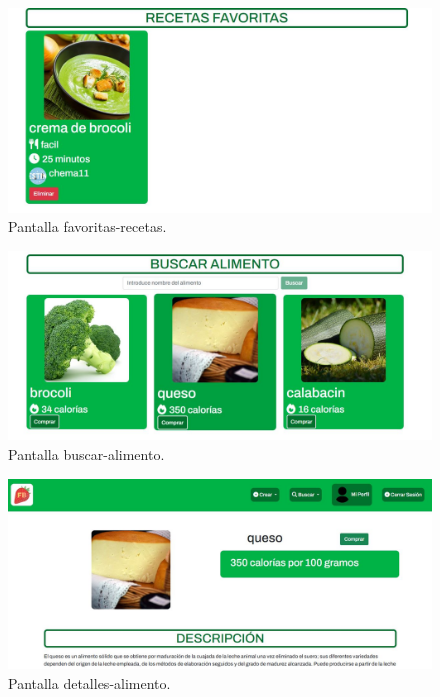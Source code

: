 \begin{figure}
  \centering
  \includegraphics[scale=0.30]{img/ma-recetas-favoritas.JPG}
  \caption{Pantalla favoritas-recetas.}
  \label{fig:ma-favoritas-recetas}
\end{figure}

\begin{figure}
  \centering
  \includegraphics[scale=0.30]{img/ma-buscar-alimento.JPG}
  \caption{Pantalla buscar-alimento.}
  \label{fig:ma-buscar-alimento}
\end{figure}

\begin{figure}
  \centering
  \includegraphics[scale=0.30]{img/ma-detalles-alimento.JPG}
  \caption{Pantalla detalles-alimento.}
  \label{fig:ma-detalles-alimento}
\end{figure}

